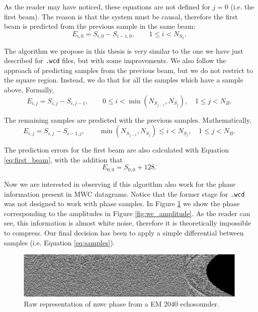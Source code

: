 As the reader may have noticed, these equations are not defined for $j=0$ (i.e. the first beam). The reason is that the system must be causal, therefore the first beam is predicted from the previous sample in the same beam:
\begin{equation} \label{eq:first_beam}
E_{i,0} = S_{i,0} - S_{i-1,0}, \qquad 1 \leq i < N_{S_0}.
\end{equation}

The algorithm we propose in this thesis is very similar to the one we have just described for \texttt{.wcd} files, but with some improvements. We also follow the approach of predicting samples from the previous beam, but we do not restrict to the square region. Instead, we do that for all the samples which have a sample above. Formally,
\begin{equation}
E_{i,j} = S_{i,j} - S_{i,j-1}, \qquad 0 \leq i < \min(N_{S_{j-1}}, N_{S_j}), \quad 1 \leq j < N_B.
\end{equation}

The remaining samples are predicted with the previous samples. Mathematically,
\begin{equation} \label{eq:samples}
E_{i,j} = S_{i,j} - S_{i-1,j}, \qquad \min(N_{S_{j-1}}, N_{S_j}) \leq i < N_{S_j}, \quad 1 \leq j < N_B.
\end{equation}

The prediction errors for the first beam are also calculated with Equation \ref{eq:first_beam}, with the addition that
\begin{equation}
E_{0,0} = S_{0,0} + 128.
\end{equation}

Now we are interested in observing if this algorithm also work for the phase information present in MWC datagrams. Notice that the former stage for \texttt{.wcd} was not designed to work with phase samples. In Figure \ref{fig:wc_phase} we show the phase corresponding to the amplitudes in Figure \ref{fig:wc_amplitude}. As the reader can see, this information is almost white noise, therefore it is theoretically impossible to compress. Our final decision has been to apply a simple differential between samples (i.e. Equation \ref{eq:samples}).
\begin{figure}[h!]
	\begin{center}
		\includegraphics[scale=0.334]{images/water_column_ph.png}
	\end{center}
	\caption{Raw representation of \acrshort{mwc} phase from a EM 2040 echosounder.}
	\label{fig:wc_phase}
\end{figure}

